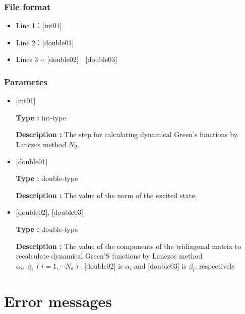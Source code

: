 \subsubsection{File format}
 \begin{itemize}
   \item  Line 1：$[$int01$]$
   \item  Line 2：$[$double01$]$
   \item  Lines 3 -: $[$double02$]$~~$[$double03$]$
  \end{itemize}
\subsubsection{Parametes}
 \begin{itemize}

  \item  $[$int01$]$

 {\bf Type :} int-type

 {\bf Description :} The step for calculating dynamical Green's functions by Lanczos method $N_d$.

  \item  $[$double01$]$

 {\bf Type :} double-type

{\bf Description :} The value of the norm of the excited state.
 
 \item  $[$double02$]$, $[$double03$]$

 {\bf Type :} double-type

{\bf Description :} The value of the components of the tridiagonal matrix to recalculate dynamical Green'S functions by Lanczos method $\alpha_i,~\beta_i~(i =1,\cdots N_d)$.
$[$double02$]$ is $\alpha_i$ and $[$double03$]$ is $\beta_i$, respectively\\
\end{itemize}

\newpage
\section{Error messages}

